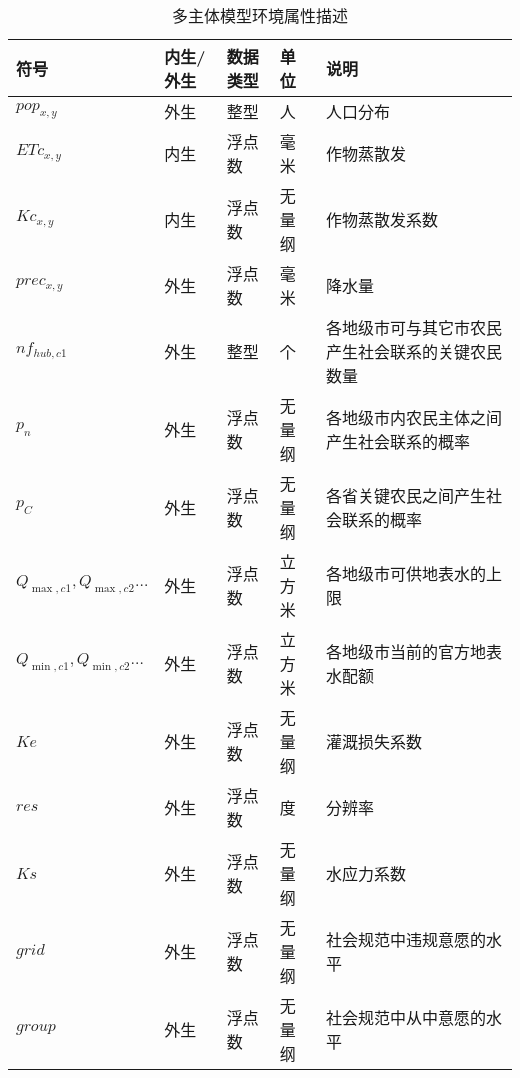 \begin{table}[htbp]
      \centering
      \caption{多主体模型环境属性描述}
        \begin{tabularx}{\textwidth}{LLLLp{6cm}}
        \toprule
        符号    & 内生/外生 & 数据类型  & 单位    & 说明 \\
        \midrule
        $pop_{x, y}$ & 外生    & 整型    & 人     & 人口分布 \\
        $ETc_{x, y}$ & 内生    & 浮点数   & 毫米    & 作物蒸散发 \\
        $Kc_{x, y}$ & 内生    & 浮点数   & 无量纲   & 作物蒸散发系数 \\
        $prec_{x, y}$ & 外生    & 浮点数   & 毫米    & 降水量 \\
        $nf_{hub, c1}$ & 外生    & 整型    & 个     & 各地级市可与其它市农民产生社会联系的关键农民数量 \\
        $p_n$ & 外生    & 浮点数   & 无量纲   & 各地级市内农民主体之间产生社会联系的概率 \\
        $p_C$ & 外生    & 浮点数   & 无量纲   & 各省关键农民之间产生社会联系的概率 \\
        ${Q_{\max, c1}, Q_{\max, c2} \dots}$ & 外生    & 浮点数   & 立方米   & 各地级市可供地表水的上限 \\
        ${Q_{\min, c1}, Q_{\min, c2} \dots}$ & 外生    & 浮点数   & 立方米   & 各地级市当前的官方地表水配额 \\
        $Ke$  & 外生    & 浮点数   & 无量纲   & 灌溉损失系数 \\
        $res$ & 外生    & 浮点数   & 度     & 分辨率 \\
        $Ks$  & 外生    & 浮点数   & 无量纲   & 水应力系数 \\
        $grid$ & 外生    & 浮点数   & 无量纲   & 社会规范中违规意愿的水平 \\
        $group$ & 外生    & 浮点数   & 无量纲   & 社会规范中从中意愿的水平 \\    
        \bottomrule
        \end{tabularx}%
      \label{ch6:tab:visa2.env}%
\end{table}%


